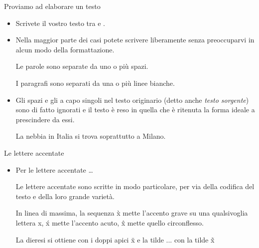 \documentclass{beamer}
\begin{document}
\begin{frame}[fragile]{\centerline{Proviamo ad elaborare un testo}}
\small
\begin{itemize}
\item Scrivete il vostro testo tra  e .
\item Nella maggior parte dei casi potete scrivere liberamente senza preoccuparvi in alcun modo della formattazione.
\begin{exampletwouptiny}
Le parole sono separate     da uno
o pi\`{u} spazi.

I paragrafi sono separati da una
o pi\`{u} linee bianche.

\end{exampletwouptiny}
\item Gli spazi e gli a capo singoli nel testo originario (detto anche \textit{testo sorgente}) sono di fatto ignorati e il testo \`{e} reso in quella che \`{e} ritenuta la forma ideale a prescindere da essi.
\begin{exampletwouptiny}
La nebbia      in Italia si trova
      soprattutto    a
Milano.
\end{exampletwouptiny}
\end{itemize}
\end{frame}

\begin{frame}[fragile]{\centerline{Le lettere accentate}}
\small
\begin{itemize}
\item Per le lettere accentate \ldots
\begin{exampletwouptiny}

Le lettere accentate sono scritte
in modo particolare, per via della
codifica
del testo e della loro grande
variet\`{a}.

In linea di massima, la sequenza \`{x}
mette l'accento grave su una
qualsivoglia lettera x,
\'{x} mette l'accento acuto,
\^{x} mette quello circonflesso.

La dieresi si ottiene con i doppi
apici \"{x} e la tilde ...
con la tilde \~{x}

\end{exampletwouptiny}
\end{itemize}
\end{frame}
\end{document}

